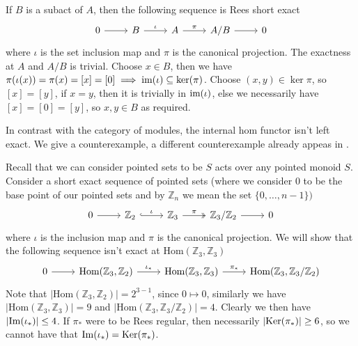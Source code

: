 \begin{example}
    If $B$ is a subact of $A$, then the following sequence is Rees short exact 
    \[\begin{tikzcd}
        0 & B & A & {A/B} & 0
        \arrow[from=1-1, to=1-2]
        \arrow["\iota", from=1-2, to=1-3]
        \arrow["\pi", from=1-3, to=1-4]
        \arrow[from=1-4, to=1-5]
    \end{tikzcd}\]
    where $\iota$ is the set inclusion map and $\pi$ is the canonical projection. 
    The exactness at $A$ and $A/B$ is trivial. Choose $x\in B$, then we have 
    $\pi(\iota(x)) = \pi(x) = [x] = [0] \implies \text{im}(\iota)\subseteq\mathrm{ker}(\pi)$. Choose 
    $(x,y)\in\ker{\pi}$, so $[x]=[y]$, if $x=y$, then it is trivially in $\text{im}(\iota)$, else 
    we necessarily have $[x]=[0]=[y]$, so $x,y\in B$ as required.
\end{example}
In contrast with the category of modules, the 
internal hom functor isn't left exact. We give a counterexample, a different 
counterexample already appeas in \cite{Chen02}.
\begin{example}
    Recall that we can consider pointed sets to be $S$ acts over any pointed monoid $S$. Consider a 
    short exact sequence of pointed sets (where we consider $0$ to be the base point of our pointed sets and by $\mathbb{Z}_n$ we mean the set $\{0,\dots,n-1\})$
    \[\begin{tikzcd}
        0 & {\mathbb{Z}_2} & {\mathbb{Z}_3} & {\mathbb{Z}_3/\mathbb{Z}_2} & 0
        \arrow[from=1-1, to=1-2]
        \arrow["\iota", hook, from=1-2, to=1-3]
        \arrow["\pi", two heads, from=1-3, to=1-4]
        \arrow[from=1-4, to=1-5]
    \end{tikzcd}\]
    where $\iota$ is the inclusion map and $\pi$ is the canonical projection.
    We will show that the following sequence isn't exact at $\text{Hom}(\mathbb{Z}_3,\mathbb{Z}_3)$
    \[\begin{tikzcd}
        0 & {\text{Hom}(\mathbb{Z}_3,\mathbb{Z}_2)} & {\text{Hom}(\mathbb{Z}_3,\mathbb{Z}_3)} & {\text{Hom}(\mathbb{Z}_3,\mathbb{Z}_3/\mathbb{Z}_2)}
        \arrow[from=1-1, to=1-2]
        \arrow["{\iota_*}", from=1-2, to=1-3]
        \arrow["{\pi_*}", from=1-3, to=1-4]
    \end{tikzcd}\]
    Note that $\left|\text{Hom}(\mathbb{Z}_3,\mathbb{Z}_2)\right| = 2^{3-1}$, since $0\mapsto 0$, similarly we have 
    $\left|\text{Hom}(\mathbb{Z}_3,\mathbb{Z}_3) \right| =9$ and $\left|\text{Hom}(\mathbb{Z}_3,\mathbb{Z}_3/\mathbb{Z}_2)\right| = 4$.
    Clearly we then have $\left|\mathrm{Im}(\iota_*)\right|\leq 4$. If $\pi_*$ were to be Rees regular, then necessarily 
    $\left|\mathrm{Ker}(\pi_*)\right| \geq 6$, so we cannot have that $\mathrm{Im}(\iota_*)=\mathrm{Ker}(\pi_*)$.
\end{example}
